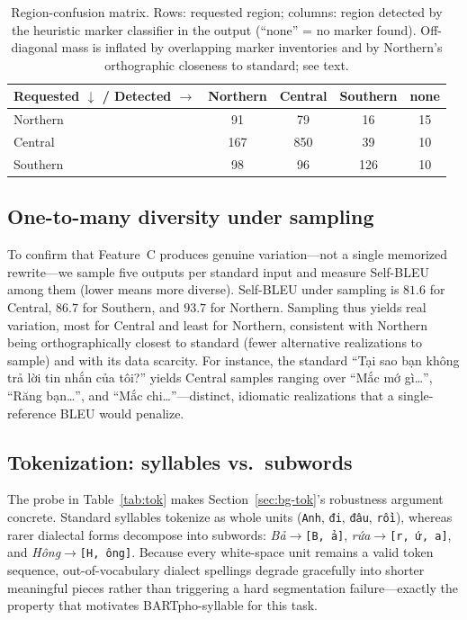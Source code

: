 \documentclass[11pt]{article}
\newcommand{\spm}{{\dejavumono\symbol{"2581}}}
\begin{document}
\begin{table}[t]
  \centering
  \footnotesize
  \caption{Region-confusion matrix. Rows: requested region; columns: region
  detected by the heuristic marker classifier in the output (``none'' = no marker
  found). Off-diagonal mass is inflated by overlapping marker inventories and by
  Northern's orthographic closeness to standard; see text.}
  \label{tab:confusion}
  \begin{tabular}{l c c c c}
    \toprule
    \textbf{Requested $\downarrow$ / Detected $\rightarrow$} & \textbf{Northern} & \textbf{Central} & \textbf{Southern} & \textbf{none}\\
    \midrule
    Northern & 91  & 79  & 16  & 15\\
    Central  & 167 & 850 & 39  & 10\\
    Southern & 98  & 96  & 126 & 10\\
    \bottomrule
  \end{tabular}
\end{table}

\subsection{One-to-many diversity under sampling}
\label{sec:analysis-diversity}

To confirm that Feature~C produces genuine variation---not a single memorized
rewrite---we sample five outputs per standard input and measure Self-BLEU among
them (lower means more diverse). Self-BLEU under sampling is $81.6$ for Central,
$86.7$ for Southern, and $93.7$ for Northern. Sampling thus yields real
variation, most for Central and least for Northern, consistent with Northern
being orthographically closest to standard (fewer alternative realizations to
sample) and with its data scarcity. For instance, the standard ``Tại sao bạn
không trả lời tin nhắn của tôi?'' yields Central samples ranging over
``Mắc mớ gì\dots'', ``Răng bạn\dots'', and ``Mắc chi\dots''---distinct, idiomatic
realizations that a single-reference BLEU would penalize.

\subsection{Tokenization: syllables vs.\ subwords}
\label{sec:analysis-tok}

The probe in Table~\ref{tab:tok} makes Section~\ref{sec:bg-tok}'s robustness
argument concrete. Standard syllables tokenize as whole units
(\texttt{\spm Anh}, \texttt{\spm đi}, \texttt{\spm đâu}, \texttt{\spm rồi}), whereas rarer
dialectal forms decompose into subwords:
\emph{Bả}$\rightarrow$\texttt{[\spm B, ả]},
\emph{rứa}$\rightarrow$\texttt{[\spm r, ứ, a]}, and
\emph{Hông}$\rightarrow$\texttt{[\spm H, ông]}. Because every white-space unit remains
a valid token sequence, out-of-vocabulary dialect spellings degrade gracefully
into shorter meaningful pieces rather than triggering a hard segmentation
failure---exactly the property that motivates BARTpho-syllable for this task.
\end{document}
